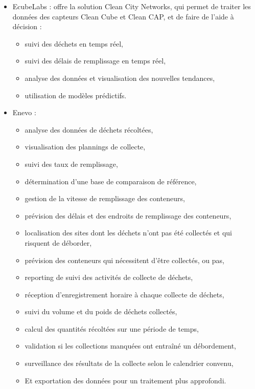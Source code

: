 \documentclass[a4paper,12pt]{report}
\begin{document}
\begin{itemize}
\begin{itemize}
\end{itemize}
 \item EcubeLabs : offre la solution Clean City Networks, qui permet de traiter les données des capteurs Clean Cube et Clean CAP, et de faire de l'aide à décision : 
 \begin{itemize}
 \item suivi des déchets en temps réel,
 \item suivi des délais de remplissage en temps réel,
 \item analyse des données et visualisation des nouvelles tendances,
 \item utilisation de modèles prédictifs.
 \end{itemize}
 \item Enevo :
 \begin{itemize}
 \item analyse des données de déchets récoltées,
 \item visualisation des plannings de collecte,
 \item suivi des taux de remplissage,
 \item détermination d'une base de comparaison de référence,
 \item gestion de la vitesse de remplissage des conteneurs,
 \item prévision des délais et des endroits de remplissage des conteneurs,
 \item localisation des sites dont les déchets n'ont pas été collectés et qui risquent de déborder,
\item  prévision des conteneurs qui nécessitent d'être collectés, ou pas,
\item reporting de suivi des activités de collecte de déchets,
\item réception d'enregistrement horaire à chaque collecte de déchets,
\item suivi du volume et du poids de déchets collectés,
\item calcul des quantités récoltées sur une période de temps,
\item validation si les collections manquées ont entraîné un débordement,
\item surveillance des résultats de la collecte selon le calendrier convenu,
\item Et exportation des données pour un traitement plus approfondi.
 \end{itemize}
\end{itemize}
\end{document}
